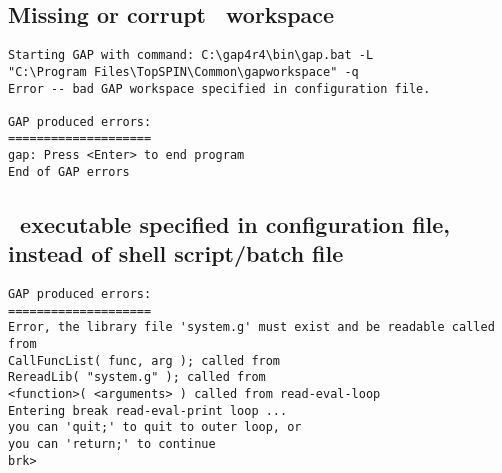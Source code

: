 
\subsection{Missing or corrupt \protect\gap\ workspace}


\exampleerrormessage

\begin{lstlisting}
Starting GAP with command: C:\gap4r4\bin\gap.bat -L
"C:\Program Files\TopSPIN\Common\gapworkspace" -q
Error -- bad GAP workspace specified in configuration file.

GAP produced errors:
====================
gap: Press <Enter> to end program
End of GAP errors
\end{lstlisting}



\subsection{\protect\gap\ executable specified in configuration file, instead of shell script/batch file}


\exampleerrormessage

\begin{lstlisting}
GAP produced errors:
====================
Error, the library file 'system.g' must exist and be readable called from
CallFuncList( func, arg ); called from
RereadLib( "system.g" ); called from
<function>( <arguments> ) called from read-eval-loop
Entering break read-eval-print loop ...
you can 'quit;' to quit to outer loop, or
you can 'return;' to continue
brk>
\end{lstlisting}

